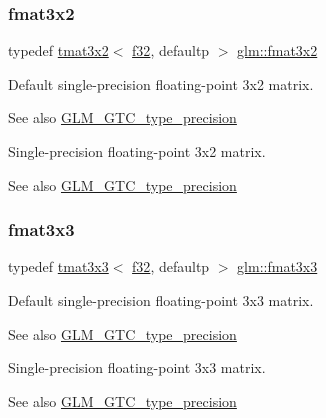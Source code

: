 \subsubsection{\texorpdfstring{fmat3x2}{fmat3x2}}
{\footnotesize\ttfamily typedef \hyperlink{structglm_1_1tmat3x2}{tmat3x2}$<$ \hyperlink{group__gtc__type__precision_ga0ec999b57f5330d9021256e96038df04}{f32}, defaultp $>$ \hyperlink{group__gtc__type__precision_gab194ac1a68dbcb228384112ebe531c67}{glm\+::fmat3x2}}

Default single-\/precision floating-\/point 3x2 matrix. \begin{DoxySeeAlso}{See also}
\hyperlink{group__gtc__type__precision}{G\+L\+M\+\_\+\+G\+T\+C\+\_\+type\+\_\+precision}
\end{DoxySeeAlso}
Single-\/precision floating-\/point 3x2 matrix. \begin{DoxySeeAlso}{See also}
\hyperlink{group__gtc__type__precision}{G\+L\+M\+\_\+\+G\+T\+C\+\_\+type\+\_\+precision} 
\end{DoxySeeAlso}
\mbox{\label{group__gtc__type__precision_ga577209f19554f5291cc3d66dda9a4388}} 
\subsubsection{\texorpdfstring{fmat3x3}{fmat3x3}}
{\footnotesize\ttfamily typedef \hyperlink{structglm_1_1tmat3x3}{tmat3x3}$<$ \hyperlink{group__gtc__type__precision_ga0ec999b57f5330d9021256e96038df04}{f32}, defaultp $>$ \hyperlink{group__gtc__type__precision_ga577209f19554f5291cc3d66dda9a4388}{glm\+::fmat3x3}}

Default single-\/precision floating-\/point 3x3 matrix. \begin{DoxySeeAlso}{See also}
\hyperlink{group__gtc__type__precision}{G\+L\+M\+\_\+\+G\+T\+C\+\_\+type\+\_\+precision}
\end{DoxySeeAlso}
Single-\/precision floating-\/point 3x3 matrix. \begin{DoxySeeAlso}{See also}
\hyperlink{group__gtc__type__precision}{G\+L\+M\+\_\+\+G\+T\+C\+\_\+type\+\_\+precision} 
\end{DoxySeeAlso}
\mbox{\label{group__gtc__type__precision_gad68d9daa91ef05b29e80e044931837cf}} 
